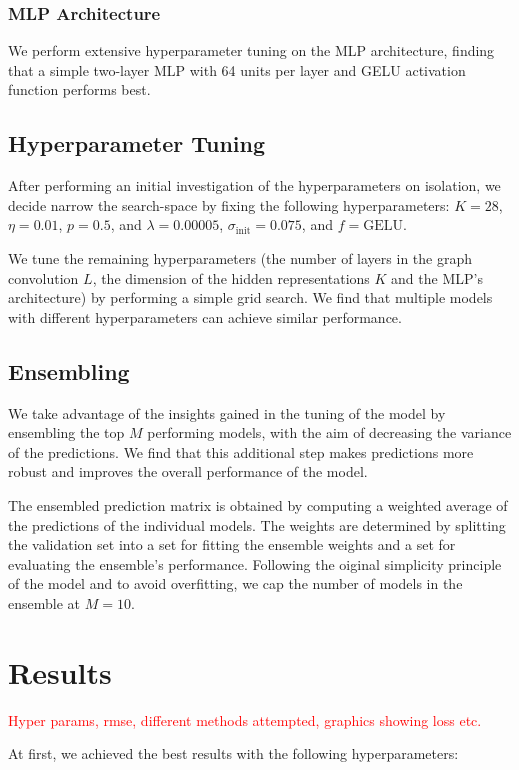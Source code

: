 \documentclass[10pt,conference,compsocconf]{IEEEtran}
\begin{document}
\subsubsection{MLP Architecture}
We perform extensive hyperparameter tuning on the MLP architecture, finding that a simple two-layer MLP with 64 units per layer and GELU activation function performs best.

\subsection{Hyperparameter Tuning}
After performing an initial investigation of the hyperparameters on isolation, we decide narrow the search-space by fixing the following hyperparameters: $K=28$, $\eta=0.01$, $p=0.5$, and $\lambda=0.00005$, $\sigma_{\text{init}}=0.075$, and $f=\text{GELU}$.

We tune the remaining hyperparameters (the number of layers in the graph convolution $L$, the dimension of the hidden representations $K$ and the MLP's architecture) by performing a simple grid search.
We find that multiple models with different hyperparameters can achieve similar performance.
\subsection{Ensembling}
We take advantage of the insights gained in the tuning of the model by ensembling the top $M$ performing models, with the aim of decreasing the variance of the predictions.
We find that this additional step makes predictions more robust and improves the overall performance of the model.

The ensembled prediction matrix is obtained by computing a weighted average of the predictions of the individual models.
The weights are determined by splitting the validation set into a set for fitting the ensemble weights and a set for evaluating the ensemble's performance.
Following the oiginal simplicity principle of the model and to avoid overfitting, we cap the number of models in the ensemble at $M=10$.

\section{Results}
\label{sec:tips-writing}

\textcolor{red}{Hyper params, rmse, different methods attempted, graphics showing loss etc.}

At first, we achieved the best results with the following hyperparameters:
\end{document}
